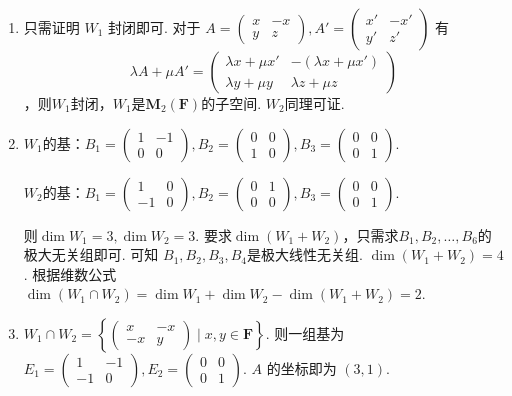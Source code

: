 \documentclass[UTF8,12pt,a4paper,fontset=fandol]{ctexart}
\begin{document}
\begin{solve}
\begin{enumerate}
                \item 只需证明 $W_1$ 封闭即可. 对于 $A=\begin{pmatrix}x & -x \\ y & z\end{pmatrix},A'=\begin{pmatrix} x' & -x' \\ y' & z' \end{pmatrix}$ 有 
\[\lambda A+\mu A'=\begin{pmatrix}
                            \lambda x+\mu x' & -(\lambda x+\mu x') \\
                            \lambda y+\mu y  & \lambda z+\mu z
                        \end{pmatrix}\]
，则$W_1$封闭，$W_1$是$\mathbf{M}_2(\mathbf{F})$的子空间.	$W_2$同理可证.

                \item $W_1$的基：$B_1=\begin{pmatrix}1&-1\\0&0\end{pmatrix},B_2=\begin{pmatrix}0&0\\1&0\end{pmatrix},B_3=\begin{pmatrix}0&0\\0&1\end{pmatrix}$.

                    $W_2$的基：$B_1=\begin{pmatrix}1&0\\-1&0\end{pmatrix},B_2=\begin{pmatrix}0&1\\0&0\end{pmatrix},B_3=\begin{pmatrix}0&0\\0&1\end{pmatrix}$.

                    则$\dim W_1=3,\dim W_2=3$. 要求$\dim  (W_1+W_2)$，只需求$B_1,B_2,\ldots ,B_6$的极大无关组即可. 可知 $B_1,B_2,B_3,B_4$是极大线性无关组.	$\dim(W_1+W_2)=4$. 根据维数公式$\dim (W_1\cap W_2)=\dim W_1+\dim W_2-\dim (W_1+W_2)=2$.

                \item $W_1\cap W_2=\left\{\begin{pmatrix}x&-x\\-x&y\end{pmatrix} \mid x,y\in \mathbf{F}\right\}$. 则一组基为$E_1=\begin{pmatrix}1&-1\\-1&0\end{pmatrix},E_2=\begin{pmatrix}0&0\\0&1\end{pmatrix}$. $A$ 的坐标即为 $(3,1)$.
            \end{enumerate}
\end{solve}
\end{document}
